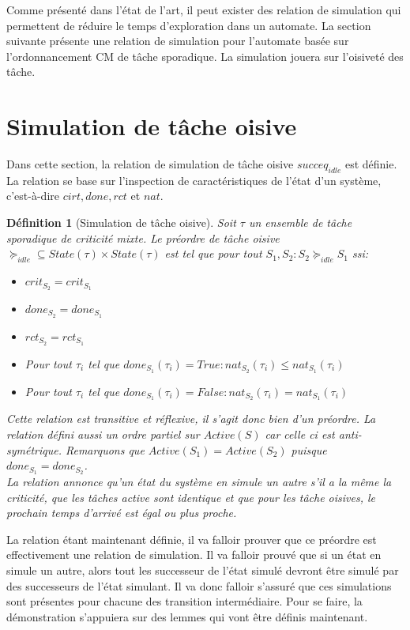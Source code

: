 \documentclass[12pt,a4paper,oneside]{book}
\theoremstyle{break}
\newtheorem{defin}{Définition}[chapter]
\theoremstyle{breakplain}
\begin{document}
Comme présenté dans l'état de l'art, il peut exister des relation de simulation qui permettent de réduire le temps d'exploration dans un automate. La section suivante présente une relation de simulation pour l'automate basée sur l'ordonnancement CM de tâche sporadique. La simulation jouera sur l'oisiveté des tâche.


\section{Simulation de tâche oisive}

Dans cette section, la relation de simulation de tâche oisive $succeq_{idle}$ est définie. La relation se base sur l'inspection de caractéristiques de l'état d'un système, c'est-à-dire $cirt, done, rct$ et $nat$.

\begin{defin}[Simulation de tâche oisive]
\label{idle:sim}
Soit $\tau$ un ensemble de tâche sporadique de criticité mixte. Le préordre de tâche oisive $\succeq_{idle} \subseteq State(\tau)\times State(\tau)$ est tel que pour tout $S_1, S_2 : S_2 \succeq_{idle}S_1$ ssi:
\begin{itemize}
\item $crit_{S_2} = crit_{S_1}$
\item $done_{S_2} = done_{S_1}$
\item $rct_{S_2} = rct_{S_1}$
\item Pour tout $\tau_i$ tel que $done_{S_1}(\tau_i) = True : nat_{S_2}(\tau_i) \leq nat_{S_1}(\tau_i)$
\item Pour tout $\tau_i$ tel que $done_{S_1}(\tau_i) = False : nat_{S_2}(\tau_i) = nat_{S_1}(\tau_i)$
\end{itemize}
Cette relation est transitive et réflexive, il s'agit donc bien d'un préordre. La relation défini aussi un ordre partiel sur $Active(S)$ car celle ci est anti-symétrique.
Remarquons que $Active(S_1) = Active (S_2)$ puisque $done_{S_1} = done_{S_2}$.\\

La relation annonce qu'un état du système en simule un autre s'il a la même la criticité, que les tâches active sont identique et que pour les tâche oisives, le prochain temps d'arrivé est égal ou plus proche.
\end{defin}

La relation étant maintenant définie, il va falloir prouver que ce préordre est effectivement une relation de simulation. Il va falloir prouvé que si un état en simule un autre, alors tout les successeur de l'état simulé devront être simulé par des successeurs de l'état simulant. Il va donc falloir s'assuré que ces simulations sont présentes pour chacune des transition intermédiaire. Pour se faire, la démonstration s'appuiera sur des lemmes qui vont être définis maintenant.\\
\end{document}

